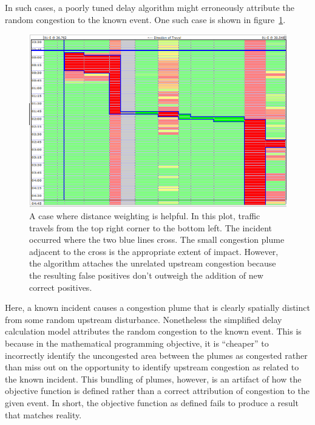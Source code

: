 \documentclass[12pt]{report}
\begin{document}
In such cases, a poorly tuned delay algorithm might erroneously
attribute the random congestion to the known event.  One such case is
shown in figure~\ref{fig:distance-weighting-helpful}.
\begin{figure}[t]
  \begin{center}
    \includegraphics[width=\textwidth]{images/distance-weighting-helpful.png}
    \caption[A case where distance weighting is helpful]{A case where distance
      weighting is helpful.  In this plot, traffic travels from the top right
      corner to the bottom left.  The incident occurred where the two blue lines
      cross.  The small congestion plume adjacent to the cross is the
      appropriate extent of impact.  However, the algorithm attaches the
      unrelated upstream congestion because the resulting false positives don't
      outweigh the addition of new correct positives.}
    \label{fig:distance-weighting-helpful}
  \end{center}
\end{figure}
Here, a known incident causes a congestion plume that is clearly
spatially distinct from some random upstream disturbance.  Nonetheless
the simplified delay calculation model attributes the random
congestion to the known event.  This is because in the mathematical
programming objective, it is ``cheaper'' to incorrectly identify the
uncongested area between the plumes as congested rather than miss out
on the opportunity to identify upstream congestion as related to the
known incident.  This bundling of plumes, however, is an artifact of
how the objective function is defined rather than a correct
attribution of congestion to the given event.  In short, the objective
function as defined fails to produce a result that matches reality.
\end{document}
